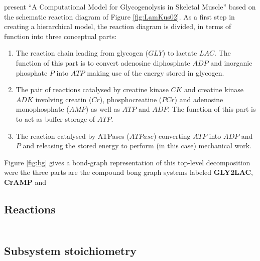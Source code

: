 \message{ !name(LamKus02_report.tex)}\documentclass[12pt,a4paper]{article}
\begin{document}
\citet{LamKus02} present ``A Computational Model for Glycogenolysis
in Skeletal Muscle'' based on the schematic reaction diagram of Figure
\ref{fig:LamKus02}. As a first step in creating a hierarchical model,
the reaction diagram is divided, in terms of function into three conceptual parts:
\begin{enumerate}
\item The reaction chain leading from glycogen ($GLY$) to lactate
  $LAC$. The function of this part is to convert adenosine diphosphate $ADP$ and
  inorganic phosphate $P$ into $ATP$ making use of the energy stored
  in glycogen.
\item The pair of reactions catalysed by creatine kinase $CK$ and
  creatine kinase $ADK$ involving creatin ($Cr$), phosphocreatine
  ($PCr$) and adenosine monophosphate ($AMP$) as well as $ATP$ and
  $ADP$. The function of this part is to act as buffer storage of
  $ATP$.
\item The reaction catalysed by ATPases ($ATPase$) converting $ATP$
  into $ADP$ and $P$ and releasing the stored energy to perform (in this
  case) mechanical work.
\end{enumerate}
Figure \ref{fig:bg} gives a bond-graph representation of this
top-level decomposition were the three parts are the compound bong
graph systems labeled \textbf{GLY2LAC}, \textbf{CrAMP} and 



\subsection{Reactions}
\begin{align}
  
\end{align}
%   

%   

\subsection{Subsystem stoichiometry}
\end{document}
